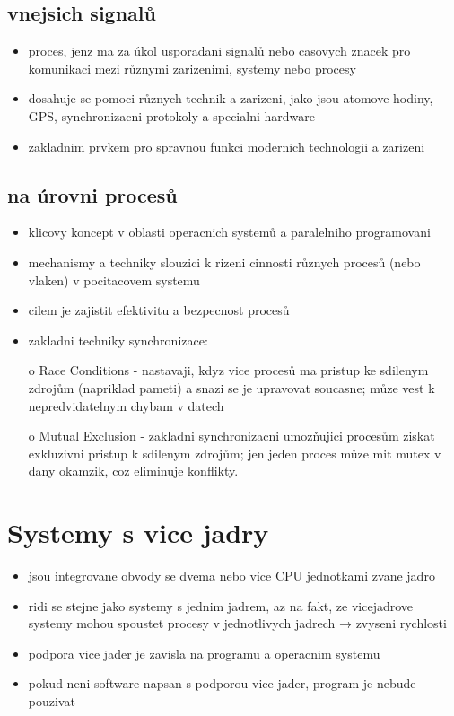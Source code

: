 \documentclass[a4paper,12pt]{article}
\begin{document}
    \subsection{vnejsich signalů}
        \begin{itemize}
            \item{proces, jenz ma za úkol usporadani signalů nebo casovych znacek pro komunikaci mezi různymi zarizenimi, systemy nebo procesy}
            \item{dosahuje se pomoci různych technik a zarizeni, jako jsou atomove hodiny, GPS, synchronizacni protokoly a specialni hardware}
            \item{zakladnim prvkem pro spravnou funkci modernich technologii a zarizeni}
        \end{itemize}
    \subsection{na úrovni procesů}
        \begin{itemize}
            \item{klicovy koncept v oblasti operacnich systemů a paralelniho programovani}
            \item{mechanismy a techniky slouzici k rizeni cinnosti různych procesů (nebo vlaken) v pocitacovem systemu}
            \item{cilem je zajistit efektivitu a bezpecnost procesů}
            \item{zakladni techniky synchronizace:}
                \item[o]{Race Conditions - nastavaji, kdyz vice procesů ma pristup ke sdilenym zdrojům (napriklad pameti) a snazi se je upravovat soucasne; můze vest k nepredvidatelnym chybam v datech}
                \item[o]{Mutual Exclusion - zakladni synchronizacni umozňujici procesům ziskat exkluzivni pristup k sdilenym zdrojům; jen jeden proces můze mit mutex v dany okamzik, coz eliminuje konflikty.}
        \end{itemize}
        
\section{Systemy s vice jadry}
    \begin{itemize}
        \item{jsou integrovane obvody se dvema nebo vice CPU jednotkami zvane jadro}
        \item{ridi se stejne jako systemy s jednim jadrem, az na fakt, ze vicejadrove systemy mohou spoustet procesy v jednotlivych jadrech → zvyseni rychlosti}
        \item{podpora vice jader je zavisla na programu a operacnim systemu}
        \item{pokud neni software napsan s podporou vice jader, program je nebude pouzivat}
    \end{itemize}
\end{document}
